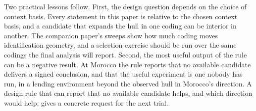 Two practical lessons follow. First, the design question depends on the choice of context basis. Every statement in this paper is
relative to the chosen context basis, and a candidate that expands the
hull in one coding can be interior in another. The companion paper's
sweeps show how much coding moves identification geometry, and a
selection exercise should be run over the same codings the final
analysis will report. Second, the most useful output of the rule can be a negative result. At Morocco the rule reports that no available candidate
delivers a signed conclusion, and that the useful experiment is one
nobody has run, in a lending environment beyond the observed hull in
Morocco's direction. A design rule that can report that no available candidate helps, and
which direction would help, gives a concrete request for the next trial.
